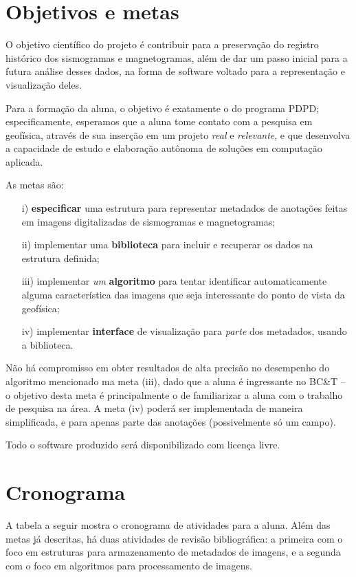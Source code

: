 \documentclass{article}
\begin{document}
\section{Objetivos e metas}

O objetivo científico do projeto é contribuir para a preservação do
registro histórico dos sismogramas e magnetogramas, além de
dar um passo inicial para a futura análise desses dados, na forma de
software voltado para a representação e visualização deles.

Para a formação da aluna, o objetivo é exatamente o do programa PDPD;
especificamente, esperamos que a aluna tome contato com a pesquisa
em geofísica, através de sua inserção em um projeto {\em real} e
{\em relevante}, e que desenvolva a capacidade de estudo e elaboração
autônoma de soluções em computação aplicada.

As metas são:
\begin{itemize}
\item[i) ] {\bf especificar} uma estrutura para representar metadados de anotações feitas em imagens digitalizadas
  de sismogramas e magnetogramas;
\item[ii) ] implementar uma {\bf biblioteca} para incluir e recuperar os
  dados na estrutura definida;
\item[iii) ] implementar {\em um} {\bf algoritmo} para tentar identificar
  automaticamente alguma característica das imagens que seja
  interessante do ponto de vista da geofísica;
\item[iv) ] implementar {\bf interface} de visualização para {\em parte}
  dos metadados, usando a biblioteca.
\end{itemize}

Não há compromisso em obter resultados de alta precisão no desempenho
do algoritmo mencionado ma meta (iii), dado que a aluna é ingressante
no BC\&T -- o objetivo desta meta é principalmente o de familiarizar
a aluna com o trabalho de pesquisa na área.
A meta (iv) poderá ser implementada de maneira simplificada, e para
apenas parte das anotações (possivelmente só um campo).

Todo o software produzido será disponibilizado com licença livre.

\section{Cronograma}

A tabela a seguir mostra o cronograma de atividades para a aluna. Além
das metas já descritas, há duas atividades de revisão bibliográfica: a
primeira com o foco em estruturas para armazenamento de metadados de
imagens, e a segunda com o foco em algoritmos para processamento de
imagens.
\end{document}
